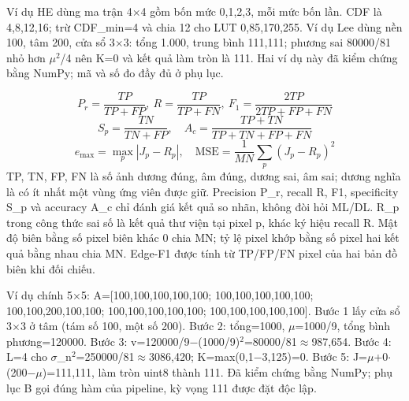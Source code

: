 \documentclass[12pt,a4paper]{extreport}
\begin{document}
Ví dụ HE dùng ma trận 4\ensuremath{\times}4 gồm bốn mức 0,\allowbreak{}1,\allowbreak{}2,\allowbreak{}3,\allowbreak{} mỗi mức bốn lần. CDF là 4,\allowbreak{}8,\allowbreak{}12,\allowbreak{}16; trừ CDF\_min=\allowbreak{}4 và chia 12 cho LUT 0,\allowbreak{}85,\allowbreak{}170,\allowbreak{}255. Ví dụ Lee dùng nền 100,\allowbreak{} tâm 200,\allowbreak{} cửa sổ 3\ensuremath{\times}3: tổng 1.000,\allowbreak{} trung bình 111,\allowbreak{}111; phương sai 80000/\allowbreak{}81 nhỏ hơn \ensuremath{\mu}\ensuremath{{}^2}/\allowbreak{}4 nên K=\allowbreak{}0 và kết quả làm tròn là 111. Hai ví dụ này đã kiểm chứng bằng NumPy; mã và số đo đầy đủ ở phụ lục.
\par
\begin{equation}P_r=\frac{TP}{TP+FP},\ R=\frac{TP}{TP+FN},\ F_1=\frac{2TP}{2TP+FP+FN}\tag{2.14}\end{equation}
\begin{equation}S_p=\frac{TN}{TN+FP},\quad A_c=\frac{TP+TN}{TP+TN+FP+FN}\tag{2.15}\end{equation}
\begin{equation}e_{\max}=\max_p|J_p-R_p|,\quad \mathrm{MSE}=\frac{1}{MN}\sum_p(J_p-R_p)^2\tag{2.16}\end{equation}
TP,\allowbreak{} TN,\allowbreak{} FP,\allowbreak{} FN là số ảnh dương đúng,\allowbreak{} âm đúng,\allowbreak{} dương sai,\allowbreak{} âm sai; dương nghĩa là có ít nhất một vùng ứng viên được giữ. Precision P\_r,\allowbreak{} recall R,\allowbreak{} F1,\allowbreak{} specificity S\_p và accuracy A\_c chỉ đánh giá kết quả so nhãn,\allowbreak{} không đòi hỏi ML/\allowbreak{}DL. R\_p trong công thức sai số là kết quả thư viện tại pixel p,\allowbreak{} khác ký hiệu recall R. Mật độ biên bằng số pixel biên khác 0 chia MN; tỷ lệ pixel khớp bằng số pixel hai kết quả bằng nhau chia MN. Edge-F1 được tính từ TP/\allowbreak{}FP/\allowbreak{}FN pixel của hai bản đồ biên khi đối chiếu.
\par
Ví dụ chính 5\ensuremath{\times}5: A=\allowbreak{}[100,\allowbreak{}100,\allowbreak{}100,\allowbreak{}100,\allowbreak{}100; 100,\allowbreak{}100,\allowbreak{}100,\allowbreak{}100,\allowbreak{}100; 100,\allowbreak{}100,\allowbreak{}200,\allowbreak{}100,\allowbreak{}100; 100,\allowbreak{}100,\allowbreak{}100,\allowbreak{}100,\allowbreak{}100; 100,\allowbreak{}100,\allowbreak{}100,\allowbreak{}100,\allowbreak{}100]. Bước 1 lấy cửa sổ 3\ensuremath{\times}3 ở tâm (tám số 100,\allowbreak{} một số 200). Bước 2: tổng=\allowbreak{}1000,\allowbreak{} \ensuremath{\mu}=\allowbreak{}1000/\allowbreak{}9,\allowbreak{} tổng bình phương=\allowbreak{}120000. Bước 3: v=\allowbreak{}120000/\allowbreak{}9\ensuremath{-}(1000/\allowbreak{}9)\ensuremath{{}^2}=\allowbreak{}80000/\allowbreak{}81\ensuremath{\approx}987,\allowbreak{}654. Bước 4: L=\allowbreak{}4 cho \ensuremath{\sigma}\_n\ensuremath{{}^2}=\allowbreak{}250000/\allowbreak{}81\ensuremath{\approx}3086,\allowbreak{}420; K=\allowbreak{}max(0,\allowbreak{}1\ensuremath{-}3,\allowbreak{}125)=\allowbreak{}0. Bước 5: J=\allowbreak{}\ensuremath{\mu}+\allowbreak{}0\ensuremath{\cdot}(200\ensuremath{-}\ensuremath{\mu})=\allowbreak{}111,\allowbreak{}111,\allowbreak{} làm tròn uint8 thành 111. Đã kiểm chứng bằng NumPy; phụ lục B gọi đúng hàm của pipeline,\allowbreak{} kỳ vọng 111 được đặt độc lập.
\par
\end{document}
